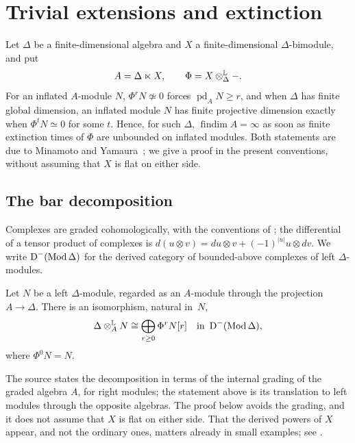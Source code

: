 \section{Trivial extensions and extinction}
\label{sec:extinction}

Let $\Delta$ be a finite-dimensional algebra and $X$ a finite-dimensional
$\Delta$-bimodule, and put
\[
  A=\Delta\ltimes X,\qquad\Phi=X\Lotimes[\Delta]-.
\]
For an inflated $A$-module $N$, ${\Phi^rN\not\simeq0}$ forces
${\operatorname{pd}_AN\geq r}$, and when $\Delta$ has finite global dimension, an
inflated module $N$ has finite projective dimension exactly when
${\Phi^tN\simeq0}$ for some $t$. Hence, for such $\Delta$,
${\operatorname{findim}A=\infty}$ as soon as finite extinction times of $\Phi$
are unbounded on inflated modules. Both statements are due to Minamoto and
Yamaura~\cite{MY20}; we give a proof in the present conventions, without
assuming that $X$ is flat on either side.

\subsection{The bar decomposition}
\label{subsec:bar-decomposition}

Complexes are graded cohomologically, with the conventions of
; the differential of a tensor product of complexes is
${d(u\otimes v)=du\otimes v+(-1)^{|u|}u\otimes dv}$. We write
${\DerCat[-]{\operatorname{Mod}\Delta}}$ for the derived category of
bounded-above complexes of left $\Delta$-modules.

\begin{theorem}
  \label{thm:bar-decomposition}
  Let $N$ be a left $\Delta$-module, regarded as an $A$-module through the
  projection ${A\to\Delta}$. There is an isomorphism, natural in~$N$,
  \[
    \Delta\Lotimes[A]N\cong\bigoplus_{r\geq0}\Phi^rN[r]
    \quad\text{in }\DerCat[-]{\operatorname{Mod}\Delta},
  \]
  where ${\Phi^0N=N}$.
\end{theorem}

The source states the decomposition in terms of the internal grading of the
graded algebra $A$, for right modules; the statement above is its translation
to left modules through the opposite algebras. The proof below avoids the
grading, and it does not assume that $X$ is flat on either side. That the
derived powers of $X$ appear, and not the ordinary ones, matters already in
small examples; see .


